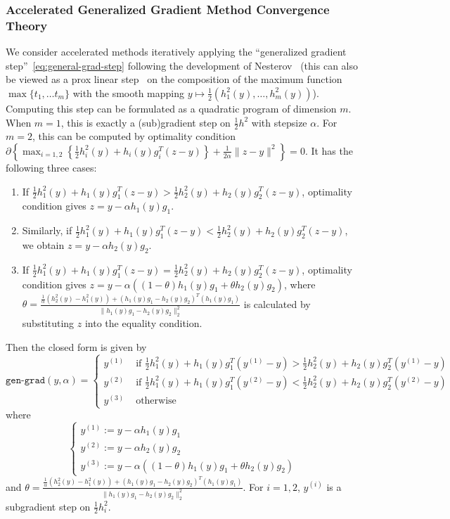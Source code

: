 \documentclass[sn-mathphys,Numbered]{sn-jnl}%
\begin{document}
\begin{appendices}
{\subsubsection{Accelerated Generalized Gradient Method Convergence Theory}
We consider accelerated methods iteratively applying the ``generalized gradient step''~\eqref{eq:general-grad-step} following the development of Nesterov~\cite{nesterov2018lectures} (this can also be viewed as a prox linear step~\cite{dima2019} on the composition of the maximum function $\max\{t_1,\dots t_m\}$ with the smooth mapping $y\mapsto \frac{1}{2}(h^2_1(y),\dots,h^2_m(y))$). Computing this step can be formulated as a quadratic program of dimension $m$. When $m=1$, this is exactly a (sub)gradient step on $\frac{1}{2}h^2$ with stepsize $\alpha$. For $m=2$, this can be computed by optimality condition $\partial\left\{\max_{i=1,2}\left\{\frac{1}{2}h^2_i(y) + h_i(y)g_i^T(z-y)\right\} + \frac{1}{2\alpha}\|z-y\|^2\right\}=0$. It has the following three cases: 
\begin{enumerate}
    \item[(a)] If $\frac{1}{2}h^2_1(y) + h_1(y)g_1^T(z-y) > \frac{1}{2}h^2_2(y) + h_2(y)g_2^T(z-y)$, optimality condition gives $z=y-\alpha h_1(y)g_1$. \\ 
    \item[(b)] Similarly, if $\frac{1}{2}h^2_1(y) + h_1(y)g_1^T(z-y) < \frac{1}{2}h^2_2(y) + h_2(y)g_2^T(z-y)$, we obtain $z=y-\alpha h_2(y)g_2$. \\
    \item[(c)] If $\frac{1}{2}h^2_1(y) + h_1(y)g_1^T(z-y) = \frac{1}{2}h^2_2(y) + h_2(y)g_2^T(z-y)$, optimality condition gives $z=y-\alpha \left((1-\theta)h_1(y)g_1+\theta h_2(y)g_2\right)$, where $\theta =  \frac{\frac{1}{\alpha}(h_2^2(y)-h_1^2(y))+(h_1(y)g_1-h_2(y)g_2)^T(h_1(y)g_1)}{\|h_1(y)g_1-h_2(y)g_2\|_2^2}$ is calculated by substituting $z$ into the equality condition.
\end{enumerate}
  Then the closed form is given by
$$ \mathtt{gen\mbox{-}grad}(y,\alpha) = \begin{cases}
y^{(1)} & \text{ if } \frac{1}{2}h^2_1(y) + h_1(y)g_1^T(y^{(1)}-y) > \frac{1}{2}h^2_2(y) + h_2(y)g_2^T(y^{(1)}-y)\\
y^{(2)} & \text{ if } \frac{1}{2}h^2_1(y) + h_1(y)g_1^T(y^{(2)}-y) < \frac{1}{2}h^2_2(y) + h_2(y)g_2^T(y^{(2)}-y)\\
y^{(3)} & \text{ otherwise}
\end{cases}$$
where $$\begin{cases}y^{(1)} := y-\alpha h_1(y)g_1 \\ 
y^{(2)} := y-\alpha h_2(y)g_2 \\ 
y^{(3)}:=y-\alpha \left((1-\theta)h_1(y)g_1+\theta h_2(y)g_2\right)
\end{cases}$$ 
and $\theta =  \frac{\frac{1}{\alpha}(h_2^2(y)-h_1^2(y))+(h_1(y)g_1-h_2(y)g_2)^T(h_1(y)g_1)}{\|h_1(y)g_1-h_2(y)g_2\|_2^2}$. For $i=1,2$, $y^{(i)}$ is a subgradient step on $\frac{1}{2}h_i^2$.

}
\end{appendices}
\end{document}
